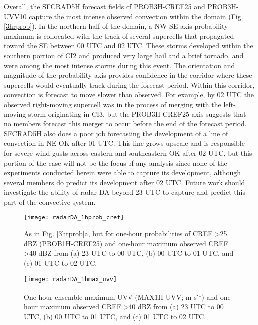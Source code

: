 Overall, the SFCRAD5H forecast fields of PROB3H-CREF25 and PROB3H-UVV10 capture the most intense observed convection within the domain (Fig. \ref{3hrprob}). In the northern half of the domain, a NW-SE axis probability maximum is collocated with the track of several supercells that propagated toward the SE between 00 UTC and 02 UTC. These storms developed within the southern portion of CI2 and produced very large hail and a brief tornado, and were among the most intense storms during this event. The orientation and magnitude of the probability axis provides confidence in the corridor where these supercells would eventually track during the forecast period. Within this corridor, convection is forecast to move slower than observed. For example, by 02 UTC the observed right-moving supercell was in the process of merging with the left-moving storm originating in CI3, but the PROB3H-CREF25 axis suggests that no members forecast this merger to occur before the end of the forecast period. SFCRAD5H also does a poor job forecasting the development of a line of convection in NE OK after 01 UTC. This line grows upscale and is responsible for severe wind gusts across eastern and southeastern OK after 02 UTC, but this portion of the case will not be the focus of any analysis since none of the experiments conducted herein were able to capture its development, although several members do predict its development after 02 UTC. Future work should investigate the ability of radar DA beyond 23 UTC to capture and predict this part of the convective system.

\begin{figure}
\centering
\texttt{[image: radarDA\_1hprob\_cref]}
\caption{As in Fig. \ref{3hrprob}a, but for one-hour probabilities of CREF \textgreater 25 dBZ (PROB1H-CREF25) and one-hour maximum observed CREF \textgreater 40 dBZ from (a) 23 UTC to 00 UTC, (b) 00 UTC to 01 UTC, and (c) 01 UTC to 02 UTC.}
\label{1hprob_cref}
\end{figure}
\begin{figure}
\centering
\texttt{[image: radarDA\_1hmax\_uvv]}
\caption{One-hour ensemble maximum UVV (MAX1H-UVV; m s\textsuperscript{-1}) and one-hour maximum observed CREF \textgreater 40 dBZ from (a) 23 UTC to 00 UTC, (b) 00 UTC to 01 UTC, and (c) 01 UTC to 02 UTC.}
\label{1hmax_uvv}
\end{figure}

